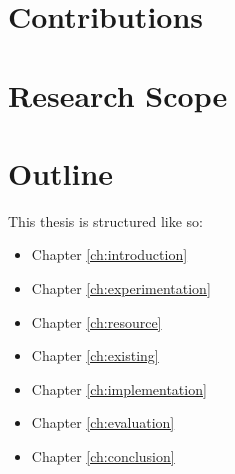 \section{Contributions}

\section{Research Scope}


\section{Outline}
This thesis is structured like so:
\begin{itemize}
	\item Chapter \ref{ch:introduction} \chIntroduction \\
	\item Chapter \ref{ch:experimentation} \chExperimentation \\
	\item Chapter \ref{ch:resource} \chResource \\
	\item Chapter \ref{ch:existing} \chExisting \\
	\item Chapter \ref{ch:implementation} \chImplementation \\
	\item Chapter \ref{ch:evaluation} \chEvaluation \\
	\item Chapter \ref{ch:conclusion} \chConclusion \\
\end{itemize}
